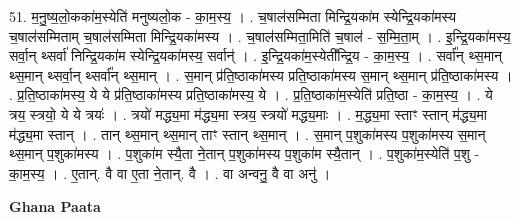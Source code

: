\documentclass[17pt]{extarticle}
\begin{document}
51. म॒नु॒ष्य॒लो॒कका॑म॒स्येति॑ मनुष्यलो॒क - का॒म॒स्य॒ । . च॒षाल॑सम्मिता मिन्द्रि॒यका॑म स्येन्द्रि॒यका॑मस्य च॒षाल॑सम्मिताम् च॒षाल॑सम्मिता मिन्द्रि॒यका॑मस्य । . च॒षाल॑सम्मिता॒मिति॑ च॒षाल॑ - स॒म्मि॒ता॒म् । . इ॒न्द्रि॒यका॑मस्य॒ सर्वा॒न् थ्सर्वा॑ निन्द्रि॒यका॑म स्येन्द्रि॒यका॑मस्य॒ सर्वान्॑ । . इ॒न्द्रि॒यका॑म॒स्येती᳚न्द्रि॒य - का॒म॒स्य॒ । . सर्वा᳚न् थ्स॒मान् थ्स॒मान् थ्सर्वा॒न् थ्सर्वा᳚न् थ्स॒मान् । . स॒मान् प्र॑ति॒ष्ठाका॑मस्य प्रति॒ष्ठाका॑मस्य स॒मान् थ्स॒मान् प्र॑ति॒ष्ठाका॑मस्य । . प्र॒ति॒ष्ठाका॑मस्य॒ ये ये प्र॑ति॒ष्ठाका॑मस्य प्रति॒ष्ठाका॑मस्य॒ ये । . प्र॒ति॒ष्ठाका॑म॒स्येति॑ प्रति॒ष्ठा - का॒म॒स्य॒ । . ये त्रय॒ स्त्रयो॒ ये ये त्रयः॑ । . त्रयो॑ मद्ध्य॒मा म॑द्ध्य॒मा स्त्रय॒ स्त्रयो॑ मद्ध्य॒माः । . म॒द्ध्य॒मा स्ताꣳ स्तान् म॑द्ध्य॒मा म॑द्ध्य॒मा स्तान् । . तान् थ्स॒मान् थ्स॒मान् ताꣳ स्तान् थ्स॒मान् । . स॒मान् प॒शुका॑मस्य प॒शुका॑मस्य स॒मान् थ्स॒मान् प॒शुका॑मस्य । . प॒शुका॑म स्यै॒ता ने॒तान् प॒शुका॑मस्य प॒शुका॑म स्यै॒तान् । . प॒शुका॑म॒स्येति॑ प॒शु - का॒म॒स्य॒ । . ए॒तान्. वै वा ए॒ता ने॒तान्. वै । . वा अन्वनु॒ वै वा अनु॑ । \newline

\textbf{Ghana Paata } \newline
\end{document}
